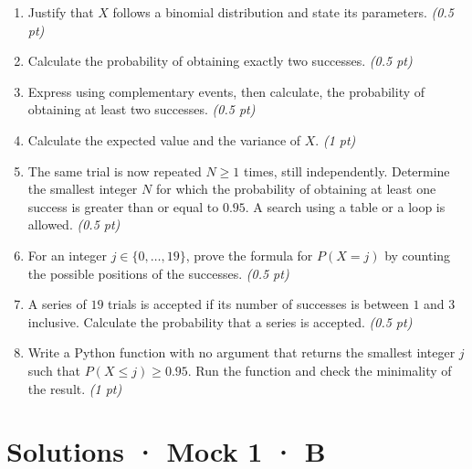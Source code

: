 \begin{enumerate}

\item Justify that $X$ follows a binomial distribution and state its parameters. \hfill\textit{(0.5 pt)}

\item Calculate the probability of obtaining exactly two successes. \hfill\textit{(0.5 pt)}

\item Express using complementary events, then calculate, the probability of obtaining at least two successes. \hfill\textit{(0.5 pt)}

\item Calculate the expected value and the variance of $X$. \hfill\textit{(1 pt)}

\item The same trial is now repeated $N\ge1$ times, still independently. Determine the smallest integer $N$ for which the probability of obtaining at least one success is greater than or equal to $\num{0,95}$. A search using a table or a loop is allowed. \hfill\textit{(0.5 pt)}

\item For an integer $j\in\{0,\ldots,19\}$, prove the formula for $P(X=j)$ by counting the possible positions of the successes. \hfill\textit{(0.5 pt)}

\item A series of $19$ trials is accepted if its number of successes is between $1$ and $3$ inclusive. Calculate the probability that a series is accepted. \hfill\textit{(0.5 pt)}

\item Write a Python function with no argument that returns the smallest integer $j$ such that $P(X\le j)\ge\num{0,95}$. Run the function and check the minimality of the result. \hfill\textit{(1 pt)}

\end{enumerate}

\ifmxteacher\mxnewpage

\section*{Solutions · Mock 1 · B}\label{cor:5-4}

